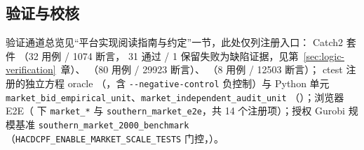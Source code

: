 \documentclass[UTF8,fontset=fandol,a4paper,11pt]{ctexart}
\begin{document}
\subsection{验证与校核}
验证通道总览见“平台实现阅读指南与约定”一节，此处仅列注册入口：
Catch2 套件 （32 用例 / 1074 断言，
31 通过 / 1 保留失败为缺陷证据，见第~\ref{sec:logic-verification}~章）、
（80 用例 / 29923 断言）、
（8 用例 / 12503 断言）；
ctest 注册的独立方程 oracle 
（，含 \texttt{-{}-negative-control} 负控制）与
Python 单元 \texttt{market\_bid\_empirical\_unit}、\texttt{market\_independent\_audit\_unit}
（）；浏览器 E2E（ 下
\texttt{market\_*} 与 \texttt{southern\_market\_e2e}，共 14 个注册项）；授权 Gurobi 规模基准
\texttt{southern\_market\_2000\_benchmark}（\texttt{HACDCPF\_ENABLE\_MARKET\_SCALE\_TESTS}
门控，）。
\end{document}
